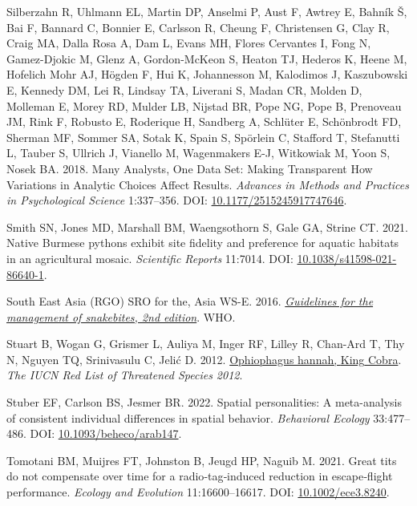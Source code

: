 \documentclass[10pt,a4paper]{article}
\newlength{\cslhangindent}
\newenvironment{CSLReferences}[2] %
 {\begin{list}{}{%
  \setlength{\itemindent}{0pt}
  \setlength{\leftmargin}{0pt}
  \setlength{\parsep}{0pt}
  \ifodd #1
   \setlength{\leftmargin}{\cslhangindent}
   \setlength{\itemindent}{-1\cslhangindent}
  \fi
  \setlength{\itemsep}{#2\baselineskip}}}
 {\end{list}}
\begin{document}
\begin{CSLReferences}{1}{0}
Silberzahn R, Uhlmann EL, Martin DP, Anselmi P, Aust F, Awtrey E, Bahník Š, Bai F, Bannard C, Bonnier E, Carlsson R, Cheung F, Christensen G, Clay R, Craig MA, Dalla Rosa A, Dam L, Evans MH, Flores Cervantes I, Fong N, Gamez-Djokic M, Glenz A, Gordon-McKeon S, Heaton TJ, Hederos K, Heene M, Hofelich Mohr AJ, Högden F, Hui K, Johannesson M, Kalodimos J, Kaszubowski E, Kennedy DM, Lei R, Lindsay TA, Liverani S, Madan CR, Molden D, Molleman E, Morey RD, Mulder LB, Nijstad BR, Pope NG, Pope B, Prenoveau JM, Rink F, Robusto E, Roderique H, Sandberg A, Schlüter E, Schönbrodt FD, Sherman MF, Sommer SA, Sotak K, Spain S, Spörlein C, Stafford T, Stefanutti L, Tauber S, Ullrich J, Vianello M, Wagenmakers E-J, Witkowiak M, Yoon S, Nosek BA. 2018. Many {Analysts}, {One} {Data} {Set}: {Making} {Transparent} {How} {Variations} in {Analytic} {Choices} {Affect} {Results}. \emph{Advances in Methods and Practices in Psychological Science} 1:337--356. DOI: \href{https://doi.org/10.1177/2515245917747646}{10.1177/2515245917747646}.

Smith SN, Jones MD, Marshall BM, Waengsothorn S, Gale GA, Strine CT. 2021. Native {Burmese} pythons exhibit site fidelity and preference for aquatic habitats in an agricultural mosaic. \emph{Scientific Reports} 11:7014. DOI: \href{https://doi.org/10.1038/s41598-021-86640-1}{10.1038/s41598-021-86640-1}.

South East Asia (RGO) SRO for the, Asia WS-E. 2016. \emph{\href{https://www.who.int/publications/i/item/9789290225300}{Guidelines for the management of snakebites, 2nd edition}}. WHO.

Stuart B, Wogan G, Grismer L, Auliya M, Inger RF, Lilley R, Chan-Ard T, Thy N, Nguyen TQ, Srinivasulu C, Jelić D. 2012. \href{http://dx.doi.org/10.2305/IUCN.UK.2012-\%201.RLTS.T177540A1491874.en\%0ACopyright:}{Ophiophagus hannah, {King} {Cobra}}. \emph{The IUCN Red List of Threatened Species 2012}.

Stuber EF, Carlson BS, Jesmer BR. 2022. Spatial personalities: A meta-analysis of consistent individual differences in spatial behavior. \emph{Behavioral Ecology} 33:477--486. DOI: \href{https://doi.org/10.1093/beheco/arab147}{10.1093/beheco/arab147}.

Tomotani BM, Muijres FT, Johnston B, Jeugd HP, Naguib M. 2021. Great tits do not compensate over time for a radio‐tag‐induced reduction in escape‐flight performance. \emph{Ecology and Evolution} 11:16600--16617. DOI: \href{https://doi.org/10.1002/ece3.8240}{10.1002/ece3.8240}.


\end{CSLReferences}
\end{document}
